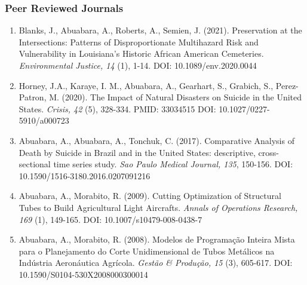 \documentclass[11pt,oneside]{article}
\begin{document}
\subsubsection{Peer Reviewed Journals}
\begin{enumerate}[leftmargin=40pt]
\item Blanks, J., Abuabara, A., Roberts, A., Semien, J. (2021). Preservation at the Intersections: Patterns of Disproportionate Multihazard Risk and Vulnerability in Louisiana's Historic African American Cemeteries. \emph{Environmental Justice, 14} (1), 1-14. DOI: 10.1089/env.2020.0044
\item Horney, J.A., Karaye, I. M., Abuabara, A., Gearhart, S., Grabich, S., Perez-Patron, M. (2020). The Impact of Natural Disasters on Suicide in the United States. \emph{Crisis, 42} (5), 328-334. PMID: 33034515 DOI: 10.1027/0227-5910/a000723
\item Abuabara, A., Abuabara, A., Tonchuk, C. (2017). Comparative Analysis of Death by Suicide in Brazil and in the United States: descriptive, cross-sectional time series study. \emph{Sao Paulo Medical Journal, 135}, 150-156. DOI: 10.1590/1516-3180.2016.0207091216
\item Abuabara, A., Morabito, R. (2009). Cutting Optimization of Structural Tubes to Build Agricultural Light Aircrafts. \emph{Annals of Operations Research, 169} (1), 149-165. DOI: 10.1007/s10479-008-0438-7
\item Abuabara, A., Morabito, R. (2008). Modelos de Programação Inteira Mista para o Planejamento do Corte Unidimensional de Tubos Metálicos na Indústria Aeronáutica Agrícola. \emph{Gestão \& Produção, 15} (3), 605-617. DOI: 10.1590/S0104-530X2008000300014
\end{enumerate}
\end{document}

